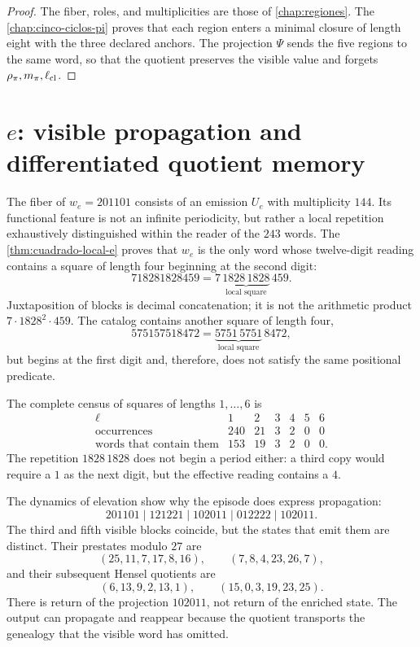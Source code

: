 \begin{proof}
The fiber, roles, and multiplicities are those of
\cref{chap:regiones}. The \cref{chap:cinco-ciclos-pi} proves that each
region enters a minimal closure of length eight with the three declared
anchors. The projection \(\Psi\) sends the five regions to the same
word, so that the quotient preserves the visible value and forgets
\(\rho_\pi,m_\pi,\ell_{\rm cl}\).
\end{proof}

\section{\texorpdfstring{\(e\)}{e}: visible propagation and differentiated quotient memory}

The fiber of \(w_e=201101\) consists of an emission \(U_e\) with multiplicity
\(144\). Its functional feature is not an infinite periodicity, but rather a
local repetition exhaustively distinguished within the reader of the
\(243\) words. The \cref{thm:cuadrado-local-e} proves that \(w_e\) is the
only word whose twelve-digit reading contains a square of length
four beginning at the second digit:
\[
718281828459
=7\,\underbrace{1828\,1828}_{\text{local square}}\,459.
\]
Juxtaposition of blocks is decimal concatenation; it is not the arithmetic
product \(7\cdot1828^2\cdot459\). The catalog contains another square of
length four,
\[
575157518472
=\underbrace{5751\,5751}_{\text{local square}}\,8472,
\]
but begins at the first digit and, therefore, does not satisfy the same
positional predicate.

The complete census of squares of lengths \(1,\ldots,6\) is
\[
\begin{array}{crrrrrr}
\ell&1&2&3&4&5&6\\
\text{occurrences}&240&21&3&2&0&0\\
\text{words that contain them}&153&19&3&2&0&0.
\end{array}
\]
The repetition \(1828\,1828\) does not begin a period either: a third copy
would require a \(1\) as the next digit, but the effective reading contains
a \(4\).

The dynamics of elevation show why the episode does express
propagation:
\[
201101\mid121221\mid102011\mid012222\mid102011.
\]
The third and fifth visible blocks coincide, but the states that
emit them are distinct. Their prestates modulo \(27\) are
\[
(25,11,7,17,8,16),
\qquad
(7,8,4,23,26,7),
\]
and their subsequent Hensel quotients are
\[
(6,13,9,2,13,1),
\qquad
(15,0,3,19,23,25).
\]
There is return of the projection \(102011\), not return of the enriched state.
The output can propagate and reappear because the quotient transports the
genealogy that the visible word has omitted.

